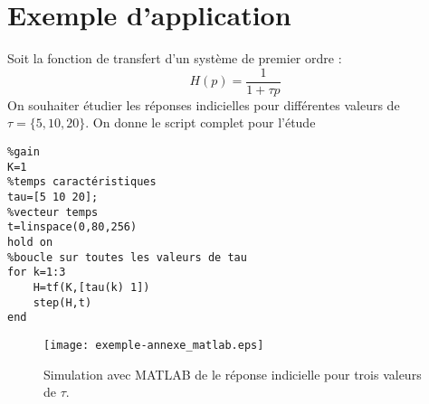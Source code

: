 \section{Exemple d'application}
Soit la fonction de transfert d'un système de premier ordre :
\[
    H(p)=\frac{1}{1+\tau p}
\]
On souhaiter étudier les réponses indicielles pour différentes valeurs
de $\tau=\{5,10,20\}$. On donne le script complet pour l'étude 
\begin{verbatim}
%gain
K=1
%temps caractéristiques
tau=[5 10 20];
%vecteur temps
t=linspace(0,80,256)
hold on
%boucle sur toutes les valeurs de tau
for k=1:3
    H=tf(K,[tau(k) 1])
    step(H,t)
end
\end{verbatim}
\begin{figure}[!h]
    \centering
    \texttt{[image: exemple-annexe\_matlab.eps]}
    \caption{Simulation avec MATLAB de le réponse indicielle pour trois 
             valeurs de $\tau$.}
\end{figure}

